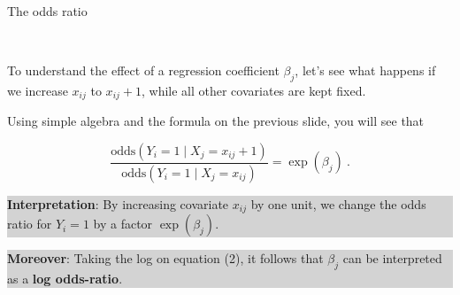 \documentclass[10pt,ignorenonframetext,]{beamer}
\begin{document}
\begin{frame}

\begin{block}{The odds ratio}

\(~\)

To understand the effect of a regression coefficient \(\beta_j\), let's
see what happens if we increase \(x_{ij}\) to \(x_{ij}+1\), while all
other covariates are kept fixed.

\vspace{2mm} Using simple algebra and the formula on the previous slide,
you will see that

\begin{equation}
\frac{\text{odds}(Y_i=1 \mid X_{j} = x_{ij} + 1)}{\text{odds}(Y_i=1 \mid X_j = x_{ij})} = \exp(\beta_j)  \ .
\end{equation}

\vspace{2mm}

\begin{center}
\colorbox{lightgray}{\begin{minipage}{11cm}
{\bf Interpretation}: 
By increasing covariate $x_{ij}$ by one unit, we change the odds ratio for $Y_i=1$ by a factor $\exp(\beta_j)$.
\end{minipage}}
\end{center}

\begin{center}
\colorbox{lightgray}{\begin{minipage}{11cm}
{\bf Moreover}:
Taking the log on equation (2), it follows that $\beta_j$ can be interpreted as a {\bf log odds-ratio}.
\end{minipage}}
\end{center}

\end{block}

\end{frame}
\end{document}
